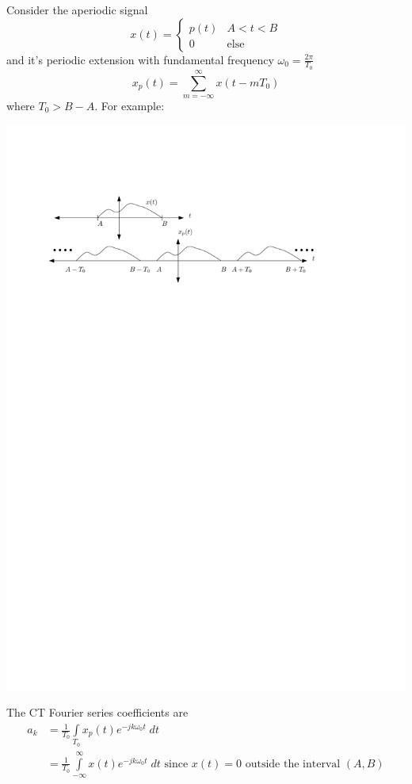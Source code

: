 Consider the aperiodic signal
\[
x(t) = \begin{cases}
  p(t) & A < t < B\\
  0 & \text{else}
\end{cases}
\]
and it's periodic extension with fundamental frequency $\omega_0 = \frac{2\pi}{T_0}$
\[
x_p(t) = \sum\limits_{m = -\infty}^{\infty} x(t-mT_0)
\]
where $T_0 > B-A$.
For example:
\begin{center}
  \includegraphics[scale=1]{graphics/ctfs_derivation.pdf}
\end{center}
The CT Fourier series coefficients are
\begin{align*}
  a_k &= \frac{1}{T_0} \int\limits_{T_0} x_p(t) e^{-jk\omega_0 t}\; dt\\
  &= \frac{1}{T_0} \int\limits_{-\infty}^{\infty} x(t) e^{-jk\omega_0 t}\; dt \mbox{ since } x(t) = 0 \mbox{ outside the interval } (A,B)\\
\end{align*}
